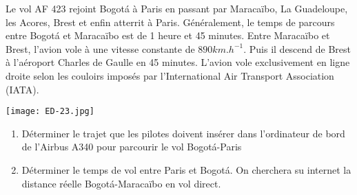 
Le vol AF 423 rejoint Bogotá à Paris en passant par Maracaïbo, La Guadeloupe, les Acores, Brest et enfin atterrit à Paris. Généralement, le temps de parcours entre Bogotá et Maracaïbo est de 1 heure et 45 minutes. Entre Maracaïbo et Brest, l'avion vole à une vitesse constante de $890 km.h^{-1}$. Puis il descend de Brest à l'aéroport Charles de Gaulle en 45 minutes. L'avion vole exclusivement en ligne droite selon les couloirs imposés par l'International Air Transport Association (IATA).


\texttt{[image: ED-23.jpg]} 


\begin{enumerate}
\item Déterminer le trajet que les pilotes doivent insérer dans l'ordinateur de bord de l'Airbus A340 pour parcourir le vol Bogotá-Paris
\item Déterminer le temps de vol entre Paris et Bogotá. On cherchera su internet la distance réelle Bogotá-Maracaïbo en vol direct.
\end{enumerate}